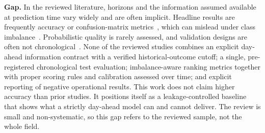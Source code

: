 \documentclass[conference]{IEEEtran}
\begin{document}
\textbf{Gap.} In the reviewed literature, horizons and the information assumed available at
prediction time vary widely and are often implicit. Headline results are frequently accuracy or
confusion-matrix metrics~\cite{choi2016,kim2016,gui2020}, which can mislead under class
imbalance~\cite{saito2015}. Probabilistic quality is rarely assessed, and validation designs are
often not chronological~\cite{zoutendijk2021}. None of the reviewed studies combines an explicit
day-ahead information contract with a verified historical-outcome cutoff; a single, pre-registered
chronological test evaluation; imbalance-aware ranking metrics together with proper scoring rules
and calibration assessed over time; and explicit reporting of negative operational results. This
work does not claim higher accuracy than prior studies. It positions itself as a leakage-controlled
baseline that shows what a strictly day-ahead model can and cannot deliver. The review is small and
non-systematic, so this gap refers to the reviewed sample, not the whole field.

\end{document}
